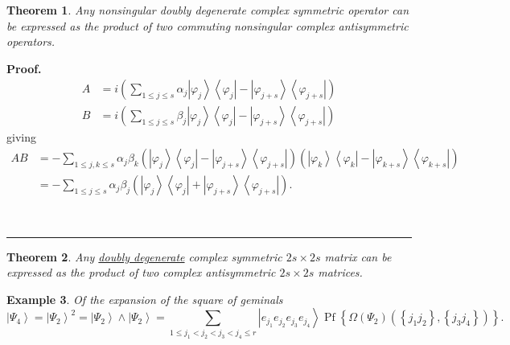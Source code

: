 \documentclass[aps,preprint]{revtex4}%
\newtheorem{theorem}{Theorem}
\newtheorem{example}[theorem]{Example}
\newenvironment{proof}[1][Proof]{\noindent\textbf{#1.} }{\ \rule{0.5em}{0.5em}}
\begin{document}
\begin{theorem}
Any nonsingular \emph{doubly degenerate }complex symmetric operator can be
expressed as the product of two commuting nonsingular complex antisymmetric operators.
\end{theorem}

\begin{proof}%
\begin{align}
A  &  =i\left(  \sum_{1\leq j\leq s}\alpha_{j}\left\vert \varphi
_{j}\right\rangle \left\langle \varphi_{j}\right\vert -\left\vert
\varphi_{j+s}\right\rangle \left\langle \varphi_{j+s}\right\vert \right) \\
B  &  =i\left(  \sum_{1\leq j\leq s}\beta_{j}\left\vert \varphi_{j}%
\right\rangle \left\langle \varphi_{j}\right\vert -\left\vert \varphi
_{j+s}\right\rangle \left\langle \varphi_{j+s}\right\vert \right)
\end{align}
giving%
\begin{align}
AB  &  =-\sum_{1\leq j,k\leq s}\alpha_{j}\beta_{k}\left(  \left\vert
\varphi_{j}\right\rangle \left\langle \varphi_{j}\right\vert -\left\vert
\varphi_{j+s}\right\rangle \left\langle \varphi_{j+s}\right\vert \right)
\left(  \left\vert \varphi_{k}\right\rangle \left\langle \varphi
_{k}\right\vert -\left\vert \varphi_{k+s}\right\rangle \left\langle
\varphi_{k+s}\right\vert \right) \\
&  =-\sum_{1\leq j\leq s}\alpha_{j}\beta_{j}\left(  \left\vert \varphi
_{j}\right\rangle \left\langle \varphi_{j}\right\vert +\left\vert
\varphi_{j+s}\right\rangle \left\langle \varphi_{j+s}\right\vert \right)  .
\end{align}

\end{proof}

\begin{theorem}
Any \underline{\emph{doubly degenerate}} complex symmetric $2s\times2s$ matrix
can be expressed as the product of two complex antisymmetric $2s\times2s$ matrices.
\end{theorem}

\begin{example}
Of the expansion of the square of geminals
\begin{equation}
\left\vert \Psi_{4}\right\rangle =\left\vert \Psi_{2}\right\rangle
^{2}=\left\vert \Psi_{2}\right\rangle \wedge\left\vert \Psi_{2}\right\rangle
=\sum_{1\leq j_{1}<j_{2}<j_{3}<j_{4}\leq r}\left\vert e_{j_{1}}e_{j_{2}%
}e_{j_{3}}e_{j_{4}}\right\rangle \operatorname{Pf}\left\{  \Omega\left(
\Psi_{2}\right)  \left(  \left\{  j_{1}j_{2}\right\}  ,\left\{  j_{3}%
j_{4}\right\}  \right)  \right\}  .
\end{equation}

\end{example}
\end{document}
